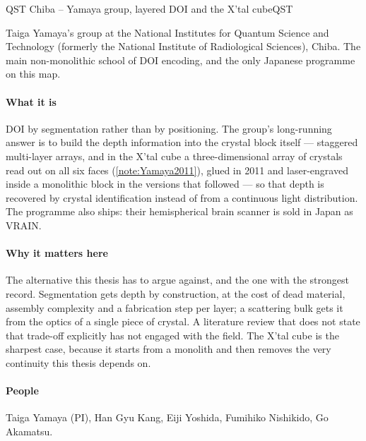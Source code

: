 \begin{programnote}{QST Chiba -- Yamaya group, layered DOI and the X'tal cube}{QST}

Taiga Yamaya's group at the National Institutes for Quantum Science and
Technology (formerly the National Institute of Radiological Sciences), Chiba.
The main non-monolithic school of DOI encoding, and the only Japanese programme
on this map.

\paragraph{What it is}
DOI by segmentation rather than by positioning. The group's long-running answer
is to build the depth information into the crystal block itself --- staggered
multi-layer arrays, and in the X'tal cube a three-dimensional array of
 crystals read out on all six faces
(\ref{note:Yamaya2011}), glued in 2011 and laser-engraved inside a monolithic
block in the versions that followed --- so that depth is recovered by
crystal identification instead of from a continuous light distribution. The
programme also ships: their hemispherical brain scanner is sold in Japan as
VRAIN.

\paragraph{Why it matters here}
The alternative this thesis has to argue against, and the one with the strongest
record. Segmentation gets depth by construction, at the cost of dead material,
assembly complexity and a fabrication step per layer; a scattering bulk gets it
from the optics of a single piece of crystal. A literature review that does not
state that trade-off explicitly has not engaged with the field. The X'tal cube
is the sharpest case, because it starts from a monolith and then removes the
very continuity this thesis depends on.

\paragraph{People}
Taiga Yamaya (PI), Han Gyu Kang, Eiji Yoshida, Fumihiko Nishikido, Go Akamatsu.


\end{programnote}
